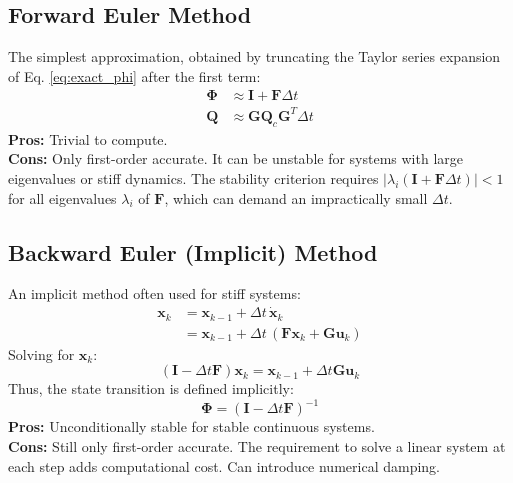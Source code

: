 \documentclass[11pt]{article}
\begin{document}
\subsection{Forward Euler Method}
The simplest approximation, obtained by truncating the Taylor series expansion of Eq. \ref{eq:exact_phi} after the first term:
\begin{align}
\bm{\Phi} &\approx \bm{I} + \bm{F} \Delta t \\
\bm{Q} &\approx \bm{G} \bm{Q}_c \bm{G}^T \Delta t \label{eq:q_euler}
\end{align}
\textbf{Pros:} Trivial to compute. \\
\textbf{Cons:} Only first-order accurate. It can be unstable for systems with large eigenvalues or stiff dynamics. The stability criterion requires $|\lambda_i(\bm{I} + \bm{F} \Delta t)| < 1$ for all eigenvalues $\lambda_i$ of $\bm{F}$, which can demand an impractically small $\Delta t$.

\subsection{Backward Euler (Implicit) Method}
An implicit method often used for stiff systems:
\begin{align}
\bm{x}_{k} &= \bm{x}_{k-1} + \Delta t \, \dot{\bm{x}}_k \\
           &= \bm{x}_{k-1} + \Delta t \, (\bm{F} \bm{x}_k + \bm{G} \bm{u}_k)
\end{align}
Solving for $\bm{x}_k$:
\begin{equation}
(\bm{I} - \Delta t \bm{F}) \bm{x}_k = \bm{x}_{k-1} + \Delta t \bm{G} \bm{u}_k
\end{equation}
Thus, the state transition is defined implicitly:
\begin{equation}
\bm{\Phi} = (\bm{I} - \Delta t \bm{F})^{-1}
\end{equation}
\textbf{Pros:} Unconditionally stable for stable continuous systems. \\
\textbf{Cons:} Still only first-order accurate. The requirement to solve a linear system at each step adds computational cost. Can introduce numerical damping.
\end{document}
